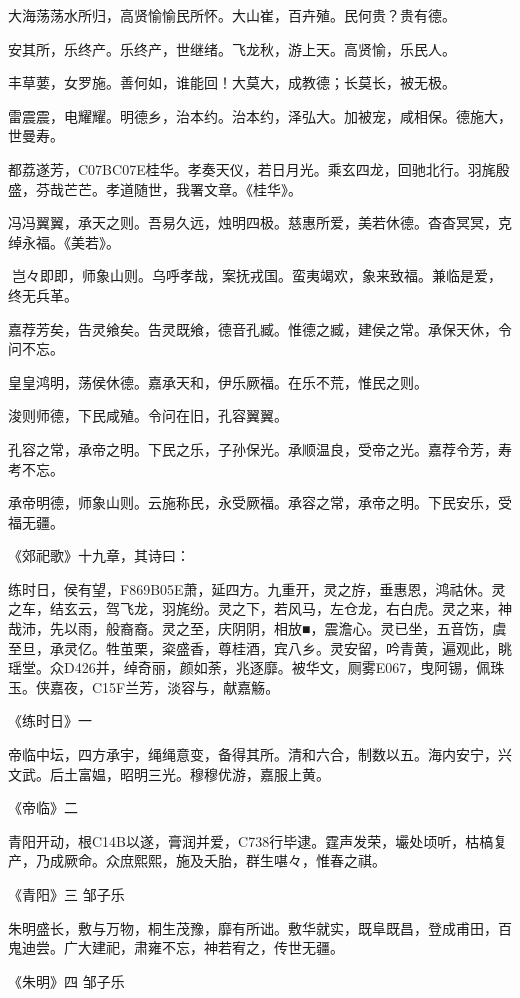 \documentclass[]{article}
\begin{document}
大海荡荡水所归，高贤愉愉民所怀。大山崔，百卉殖。民何贵？贵有德。

安其所，乐终产。乐终产，世继绪。飞龙秋，游上天。高贤愉，乐民人。

丰草葽，女罗施。善何如，谁能回！大莫大，成教德；长莫长，被无极。

雷震震，电耀耀。明德乡，治本约。治本约，泽弘大。加被宠，咸相保。德施大，世曼寿。

都荔遂芳，C07BC07E桂华。孝奏天仪，若日月光。乘玄四龙，回驰北行。羽旄殷盛，芬哉芒芒。孝道随世，我署文章。《桂华》。

冯冯翼翼，承天之则。吾易久远，烛明四极。慈惠所爱，美若休德。杳杳冥冥，克绰永福。《美若》。

岂々即即，师象山则。乌呼孝哉，案抚戎国。蛮夷竭欢，象来致福。兼临是爱，终无兵革。

嘉荐芳矣，告灵飨矣。告灵既飨，德音孔臧。惟德之臧，建侯之常。承保天休，令问不忘。

皇皇鸿明，荡侯休德。嘉承天和，伊乐厥福。在乐不荒，惟民之则。

浚则师德，下民咸殖。令问在旧，孔容翼翼。

孔容之常，承帝之明。下民之乐，子孙保光。承顺温良，受帝之光。嘉荐令芳，寿考不忘。

承帝明德，师象山则。云施称民，永受厥福。承容之常，承帝之明。下民安乐，受福无疆。

《郊祀歌》十九章，其诗曰：

练时日，侯有望，F869B05E萧，延四方。九重开，灵之斿，垂惠恩，鸿祜休。灵之车，结玄云，驾飞龙，羽旄纷。灵之下，若风马，左仓龙，右白虎。灵之来，神哉沛，先以雨，般裔裔。灵之至，庆阴阴，相放■，震澹心。灵已坐，五音饬，虞至旦，承灵亿。牲茧栗，粢盛香，尊桂酒，宾八乡。灵安留，吟青黄，遍观此，眺瑶堂。众D426并，绰奇丽，颜如荼，兆逐靡。被华文，厕雾E067，曳阿锡，佩珠玉。侠嘉夜，C15F兰芳，淡容与，献嘉觞。

《练时日》一

帝临中坛，四方承宇，绳绳意变，备得其所。清和六合，制数以五。海内安宁，兴文武。后土富媪，昭明三光。穆穆优游，嘉服上黄。

《帝临》二

青阳开动，根C14B以遂，膏润并爱，C738行毕逮。霆声发荣，壧处顷听，枯槁复产，乃成厥命。众庶熙熙，施及夭胎，群生啿々，惟春之祺。

《青阳》三 邹子乐

朱明盛长，敷与万物，桐生茂豫，靡有所诎。敷华就实，既阜既昌，登成甫田，百鬼迪尝。广大建祀，肃雍不忘，神若宥之，传世无疆。

《朱明》四 邹子乐
\end{document}
